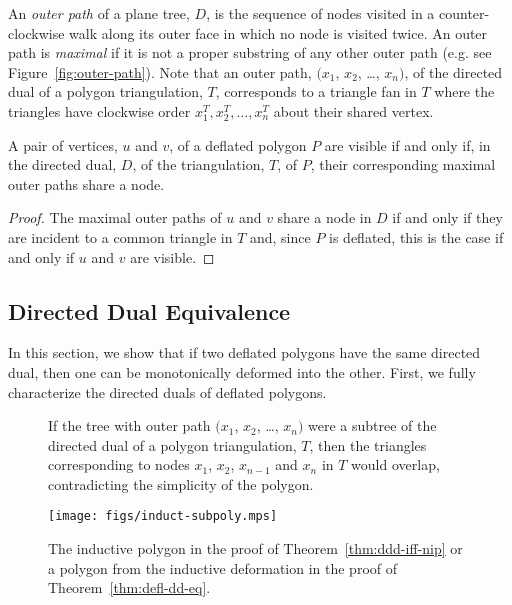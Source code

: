 \documentclass{amsart}
\begin{document}
An \emph{outer path} of a plane tree, $D$, is the sequence of nodes
visited in a counter-clockwise walk along its outer face in which no
node is visited twice.  An outer path is \emph{maximal} if it is not a
proper substring of any other outer path (e.g. see
Figure~\ref{fig:outer-path}).  Note that an outer path, $(x_1$, $x_2$,
\ldots, $x_n)$, of the directed dual of a polygon triangulation, $T$,
corresponds to a triangle fan in $T$ where the triangles have
clockwise order $x_1^T, x_2^T, \ldots, x_n^T$ about their shared
vertex.

\begin{theorem}
  A pair of vertices, $u$ and $v$, of a deflated polygon $P$ are
  visible if and only if, in the directed dual, $D$, of the
  triangulation, $T$, of $P$, their corresponding maximal outer paths
  share a node.
\end{theorem}
\begin{proof}
  The maximal outer paths of $u$ and $v$ share a node in $D$ if and
  only if they are incident to a common triangle in $T$ and, since $P$
  is deflated, this is the case if and only if $u$ and $v$ are
  visible.
\end{proof}


\subsection{Directed Dual Equivalence}

In this section, we show that if two deflated polygons have the same
directed dual, then one can be monotonically deformed into the other.
First, we fully characterize the directed duals of deflated polygons.

\begin{figure}[htb]
  \centering {} \quad
  \caption{If \protect{} the tree with outer
    path $(x_1$, $x_2$, \ldots, $x_n)$ were a subtree of the directed
    dual of a polygon triangulation, $T$,
    then \protect{} the triangles
    corresponding to nodes $x_1$, $x_2$, $x_{n-1}$ and $x_n$ in $T$
    would overlap, contradicting the simplicity of the
    polygon.}  \label{fig:ill-path}
\end{figure}

\begin{figure}[htb]
  \centering
  \texttt{[image: figs/induct-subpoly.mps]}
  \caption{The inductive polygon in the proof of
    Theorem~\ref{thm:ddd-iff-nip} or a polygon from the inductive
    deformation in the proof of Theorem~\ref{thm:defl-dd-eq}.}
  \label{fig:no-ill-then-space}
\end{figure}
\end{document}
